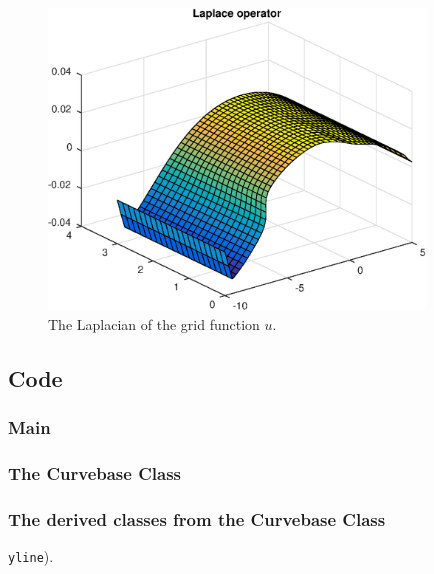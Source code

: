 \documentclass[a4paper,10pt]{article}
\begin{document}
\begin{figure}[ht]
  \centering
  \includegraphics[width = 10cm, height = 8cm]{Laplace}
  \begin{minipage}[t]{100mm}
    \caption{
      The Laplacian of the grid function $u$.
    }\label{FIG_jjj}
  \end{minipage}
\end{figure}







\FloatBarrier
\newpage
\subsection*{Code}
\subsubsection*{Main}

\subsubsection*{The Curvebase Class}


\subsubsection*{The derived classes from the Curvebase Class}
\texttt{yline}).

%

%


\end{document}
